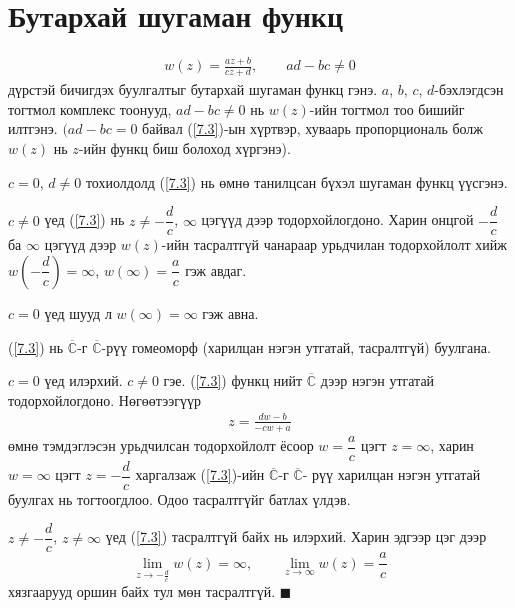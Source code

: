 \section{Бутархай шугаман функц} 
\begin{eqnarray} \label{7.3}
w(z)=\frac{az+b}{cz+d}, \qquad ad-bc\neq 0
\end{eqnarray}
дүрстэй бичигдэх буулгалтыг бутархай шугаман функц  гэнэ. $a$, $b$, $c$, $d$-бэхлэгдсэн тогтмол комплекс тоонууд, $ad-bc\neq 0$ нь $w(z)$-ийн тогтмол тоо бишийг илтгэнэ. $(ad-bc=0$ байвал (\ref{7.3})-ын хүртвэр, хуваарь пропорциональ болж $w(z)$ нь $z$-ийн функц биш болоход хүргэнэ).

$c=0$, $d\neq 0$ тохиолдолд (\ref{7.3}) нь өмнө танилцсан бүхэл шугаман функц үүсгэнэ.

$c\neq 0$ үед (\ref{7.3}) нь $z\neq -\dfrac{d}{c}$, $\infty$ цэгүүд дээр тодорхойлогдоно. Харин онцгой $-\dfrac{d}{c}$ ба $\infty$ цэгүүд дээр $w(z)$-ийн тасралтгүй чанараар урьдчилан тодорхойлолт хийж $w\left(-\dfrac{d}{c}\right)=\infty$, $w(\infty)=\dfrac{a}{c}$ гэж авдаг.

$c=0$ үед шууд л $w(\infty)=\infty$ гэж авна.
\begin{thm}
(\ref{7.3}) нь $\overline{\mathbb{C}}$-г $\overline{\mathbb{C}}$-рүү гомеоморф (харилцан нэгэн утгатай, тасралтгүй) буулгана.
\end{thm}
\begin{prf}
$c=0$ үед илэрхий. $c\neq 0$ гэе. (\ref{7.3}) функц нийт $\overline{\mathbb{C}}$ дээр нэгэн утгатай тодорхойлогдоно. Нөгөөтээгүүр 
\begin{eqnarray} \label{7.4}
z=\frac{dw-b}{-cw+a}
\end{eqnarray}
өмнө тэмдэглэсэн урьдчилсан тодорхойлолт ёсоор $w=\dfrac{a}{c}$ цэгт $z=\infty$, харин $w=\infty$ цэгт $z=-\dfrac{d}{c}$ харгалзаж (\ref{7.3})-ийн $\overline{\mathbb{C}}$-г $\overline{\mathbb{C}}$- рүү харилцан нэгэн утгатай буулгах нь тогтоогдлоо. Одоо тасралтгүйг батлах үлдэв.

$z\neq -\dfrac{d}{c}$, $z\neq \infty$ үед (\ref{7.3}) тасралтгүй байх нь илэрхий. Харин эдгээр цэг дээр 
$$\lim\limits_{z\rightarrow -\frac{d}{c}}w(z)=\infty, \qquad \lim\limits_{z\rightarrow \infty} w(z)=\frac{a}{c}$$
хязгаарууд оршин байх тул мөн тасралтгүй. 
\hfill $\blacksquare$\end{prf}

